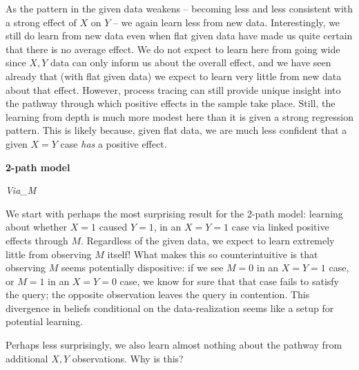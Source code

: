\documentclass[
  12pt,
]{book}
\begin{document}
As the pattern in the given data weakens -- becoming less and less consistent with a strong effect of \(X\) on \(Y\) -- we again learn less from new data. Interestingly, we still do learn from new data even when flat given data have made us quite certain that there is no average effect. We do not expect to learn here from going wide since \(X,Y\) data can only inform us about the overall effect, and we have seen already that (with flat given data) we expect to learn very little from new data about that effect. However, process tracing can still provide unique insight into the pathway through which positive effects in the sample take place. Still, the learning from depth is much more modest here than it is given a strong regression pattern. This is likely because, given flat data, we are much less confident that a given \(X=Y\) case \emph{has} a positive effect.

\textbf{2-path model}

\emph{Via\_M}

We start with perhaps the most surprising result for the 2-path model: learning about whether \(X=1\) caused \(Y=1\), in an \(X=Y=1\) case via linked positive effects through \(M\). Regardless of the given data, we expect to learn extremely little from observing \(M\) itself! What makes this so counterintuitive is that observing \(M\) seems potentially dispositive: if we see \(M=0\) in an \(X=Y=1\) case, or \(M=1\) in an \(X=Y=0\) case, we know for sure that that case fails to satisfy the query; the opposite observation leaves the query in contention. This divergence in beliefs conditional on the data-realization seems like a setup for potential learning.

Perhaps less surprisingly, we also learn almost nothing about the pathway from additional \(X, Y\) observations. Why is this?
\end{document}
